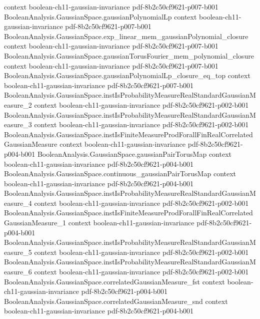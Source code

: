 \begin{theorem}
  {context}
  {boolean-ch11-gaussian-invariance}
  {pdf-8b2c50cf9621-p007-b001}
\proofstep
  {BooleanAnalysis.GaussianSpace.gaussianPolynomialLp}
  {context}
  {boolean-ch11-gaussian-invariance}
  {pdf-8b2c50cf9621-p007-b001}
\proofstep
  {BooleanAnalysis.GaussianSpace.exp_linear_mem_gaussianPolynomial_closure}
  {context}
  {boolean-ch11-gaussian-invariance}
  {pdf-8b2c50cf9621-p007-b001}
\proofstep
  {BooleanAnalysis.GaussianSpace.gaussianTorusFourier_mem_polynomial_closure}
  {context}
  {boolean-ch11-gaussian-invariance}
  {pdf-8b2c50cf9621-p007-b001}
\proofstep
  {BooleanAnalysis.GaussianSpace.gaussianPolynomialLp_closure_eq_top}
  {context}
  {boolean-ch11-gaussian-invariance}
  {pdf-8b2c50cf9621-p007-b001}
\proofstep
  {BooleanAnalysis.GaussianSpace.instIsProbabilityMeasureRealStandardGaussianMeasure_2}
  {context}
  {boolean-ch11-gaussian-invariance}
  {pdf-8b2c50cf9621-p002-b001}
\proofstep
  {BooleanAnalysis.GaussianSpace.instIsProbabilityMeasureRealStandardGaussianMeasure_3}
  {context}
  {boolean-ch11-gaussian-invariance}
  {pdf-8b2c50cf9621-p002-b001}
\proofstep
  {BooleanAnalysis.GaussianSpace.instIsFiniteMeasureProdForallFinRealCorrelatedGaussianMeasure}
  {context}
  {boolean-ch11-gaussian-invariance}
  {pdf-8b2c50cf9621-p004-b001}
\proofstep
  {BooleanAnalysis.GaussianSpace.gaussianPairTorusMap}
  {context}
  {boolean-ch11-gaussian-invariance}
  {pdf-8b2c50cf9621-p004-b001}
\proofstep
  {BooleanAnalysis.GaussianSpace.continuous_gaussianPairTorusMap}
  {context}
  {boolean-ch11-gaussian-invariance}
  {pdf-8b2c50cf9621-p004-b001}
\proofstep
  {BooleanAnalysis.GaussianSpace.instIsProbabilityMeasureRealStandardGaussianMeasure_4}
  {context}
  {boolean-ch11-gaussian-invariance}
  {pdf-8b2c50cf9621-p002-b001}
\proofstep
  {BooleanAnalysis.GaussianSpace.instIsFiniteMeasureProdForallFinRealCorrelatedGaussianMeasure_1}
  {context}
  {boolean-ch11-gaussian-invariance}
  {pdf-8b2c50cf9621-p004-b001}
\proofstep
  {BooleanAnalysis.GaussianSpace.instIsProbabilityMeasureRealStandardGaussianMeasure_5}
  {context}
  {boolean-ch11-gaussian-invariance}
  {pdf-8b2c50cf9621-p002-b001}
\proofstep
  {BooleanAnalysis.GaussianSpace.instIsProbabilityMeasureRealStandardGaussianMeasure_6}
  {context}
  {boolean-ch11-gaussian-invariance}
  {pdf-8b2c50cf9621-p002-b001}
\proofstep
  {BooleanAnalysis.GaussianSpace.correlatedGaussianMeasure_fst}
  {context}
  {boolean-ch11-gaussian-invariance}
  {pdf-8b2c50cf9621-p004-b001}
\proofstep
  {BooleanAnalysis.GaussianSpace.correlatedGaussianMeasure_snd}
  {context}
  {boolean-ch11-gaussian-invariance}
  {pdf-8b2c50cf9621-p004-b001}

\end{theorem}
